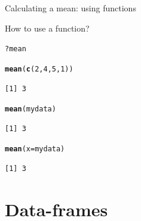 \documentclass[10pt]{beamer}\usepackage[]{graphicx}\usepackage[]{color}
\makeatletter
\newcommand{\hlnum}[1]{\textcolor[rgb]{0.686,0.059,0.569}{#1}}%
\newcommand{\hlopt}[1]{\textcolor[rgb]{0,0,0}{#1}}%
\newcommand{\hlstd}[1]{\textcolor[rgb]{0.345,0.345,0.345}{#1}}%
\newcommand{\hlkwc}[1]{\textcolor[rgb]{0.333,0.667,0.333}{#1}}%
\newcommand{\hlkwd}[1]{\textcolor[rgb]{0.737,0.353,0.396}{\textbf{#1}}}%
\newenvironment{kframe}{%
 \def\at@end@of@kframe{}%
 \ifinner\ifhmode%
  \def\at@end@of@kframe{\end{minipage}}%
  \begin{minipage}{\columnwidth}%
 \fi\fi%
 \def\FrameCommand##1{\hskip\@totalleftmargin \hskip-\fboxsep
 \colorbox{shadecolor}{##1}\hskip-\fboxsep
     \hskip-\linewidth \hskip-\@totalleftmargin \hskip\columnwidth}%
 \MakeFramed {\advance\hsize-\width
   \@totalleftmargin\z@ \linewidth\hsize
   \@setminipage}}%
 {\par\unskip\endMakeFramed%
 \at@end@of@kframe}
\newenvironment{knitrout}{}{} %
\makeatother
\begin{document}
\begin{frame}[fragile]{Calculating a mean: using functions}%
  
  How to use a function?
\begin{knitrout}
\color{fgcolor}\begin{kframe}
\begin{alltt}
  \hlopt{?}\hlstd{mean}
\end{alltt}
\end{kframe}
\end{knitrout}
  
\pause

\begin{knitrout}
\color{fgcolor}\begin{kframe}
\begin{alltt}
\hlkwd{mean}\hlstd{(}\hlkwd{c}\hlstd{(}\hlnum{2}\hlstd{,}\hlnum{4}\hlstd{,}\hlnum{5}\hlstd{,}\hlnum{1}\hlstd{))}
\end{alltt}
\begin{verbatim}
[1] 3
\end{verbatim}
\begin{alltt}
\hlkwd{mean}\hlstd{(mydata)}
\end{alltt}
\begin{verbatim}
[1] 3
\end{verbatim}
\begin{alltt}
\hlkwd{mean}\hlstd{(}\hlkwc{x} \hlstd{= mydata)}
\end{alltt}
\begin{verbatim}
[1] 3
\end{verbatim}
\end{kframe}
\end{knitrout}
  

\end{frame}

\section{Data-frames}
\end{document}
